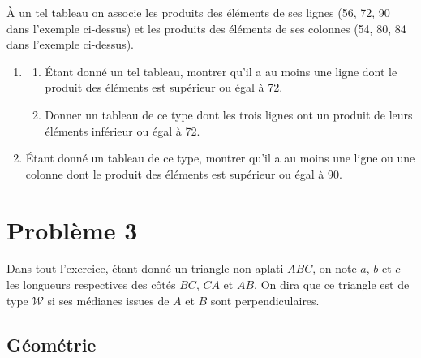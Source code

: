 \documentclass[landscape,twocolumn,leqno,a4paper,10pt]{report} %
\newcommand\n{\noindent}
\begin{document}
\n À un tel tableau on associe les produits des éléments de ses lignes (56, 72, 90 dans l'exemple ci-dessus) et les produits des éléments de ses colonnes (54, 80, 84 dans l'exemple ci-dessus).

\begin{enumerate}
	\item \begin{enumerate}
		\item Étant donné un tel tableau, montrer qu'il a au moins une ligne dont le produit des éléments est supérieur ou égal à 72.
		\item Donner un tableau de ce type dont les trois lignes ont un produit de leurs éléments inférieur ou égal à 72.
	\end{enumerate}
	\item Étant donné un tableau de ce type, montrer qu'il a au moins une ligne ou une colonne dont le produit des éléments est supérieur ou égal à 90.
\end{enumerate}

\newpage

\section{Problème 3}

\n Dans tout l'exercice, étant donné un triangle non aplati $A B C$, on note $a$, $b$ et $c$ les longueurs respectives des côtés $B C$, $C A$ et $A B$. On dira que ce triangle est de type $\mathscr{W}$ si ses médianes issues de $A$ et $B$ sont perpendiculaires.

\subsection{Géométrie}
\end{document}

